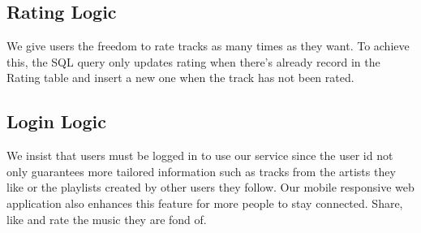 \documentclass[letterpaper, 12pt]{report}
\begin{document}
	\subsection{Rating Logic}
	We give users the freedom to rate tracks as many times as they want. To achieve this, the SQL query only updates rating when there’s already record in the Rating table and insert a new one when the track has not been rated. 
	
	\subsection{Login Logic}
	We insist that users must be logged in to use our service since the user id not only guarantees more tailored information such as tracks from the artists they like or the playlists created by other users they follow. Our mobile responsive web application also enhances this feature for more people to stay connected. Share, like and rate the music they are fond of. 
	
	
	
\end{document}
